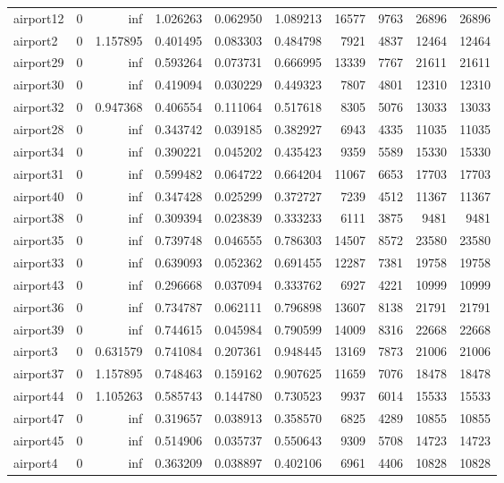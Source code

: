 \begin{longtable}{|l|r|r|r|r|r|r|r|r|r|}
airport12 & 0 & inf & 1.026263 & 0.062950 & 1.089213 & 16577 & 9763 & 26896 & 26896 \\
airport2 & 0 & 1.157895 & 0.401495 & 0.083303 & 0.484798 & 7921 & 4837 & 12464 & 12464 \\
airport29 & 0 & inf & 0.593264 & 0.073731 & 0.666995 & 13339 & 7767 & 21611 & 21611 \\
airport30 & 0 & inf & 0.419094 & 0.030229 & 0.449323 & 7807 & 4801 & 12310 & 12310 \\
airport32 & 0 & 0.947368 & 0.406554 & 0.111064 & 0.517618 & 8305 & 5076 & 13033 & 13033 \\
airport28 & 0 & inf & 0.343742 & 0.039185 & 0.382927 & 6943 & 4335 & 11035 & 11035 \\
airport34 & 0 & inf & 0.390221 & 0.045202 & 0.435423 & 9359 & 5589 & 15330 & 15330 \\
airport31 & 0 & inf & 0.599482 & 0.064722 & 0.664204 & 11067 & 6653 & 17703 & 17703 \\
airport40 & 0 & inf & 0.347428 & 0.025299 & 0.372727 & 7239 & 4512 & 11367 & 11367 \\
airport38 & 0 & inf & 0.309394 & 0.023839 & 0.333233 & 6111 & 3875 & 9481 & 9481 \\
airport35 & 0 & inf & 0.739748 & 0.046555 & 0.786303 & 14507 & 8572 & 23580 & 23580 \\
airport33 & 0 & inf & 0.639093 & 0.052362 & 0.691455 & 12287 & 7381 & 19758 & 19758 \\
airport43 & 0 & inf & 0.296668 & 0.037094 & 0.333762 & 6927 & 4221 & 10999 & 10999 \\
airport36 & 0 & inf & 0.734787 & 0.062111 & 0.796898 & 13607 & 8138 & 21791 & 21791 \\
airport39 & 0 & inf & 0.744615 & 0.045984 & 0.790599 & 14009 & 8316 & 22668 & 22668 \\
airport3 & 0 & 0.631579 & 0.741084 & 0.207361 & 0.948445 & 13169 & 7873 & 21006 & 21006 \\
airport37 & 0 & 1.157895 & 0.748463 & 0.159162 & 0.907625 & 11659 & 7076 & 18478 & 18478 \\
airport44 & 0 & 1.105263 & 0.585743 & 0.144780 & 0.730523 & 9937 & 6014 & 15533 & 15533 \\
airport47 & 0 & inf & 0.319657 & 0.038913 & 0.358570 & 6825 & 4289 & 10855 & 10855 \\
airport45 & 0 & inf & 0.514906 & 0.035737 & 0.550643 & 9309 & 5708 & 14723 & 14723 \\
airport4 & 0 & inf & 0.363209 & 0.038897 & 0.402106 & 6961 & 4406 & 10828 & 10828 \\

\end{longtable}
